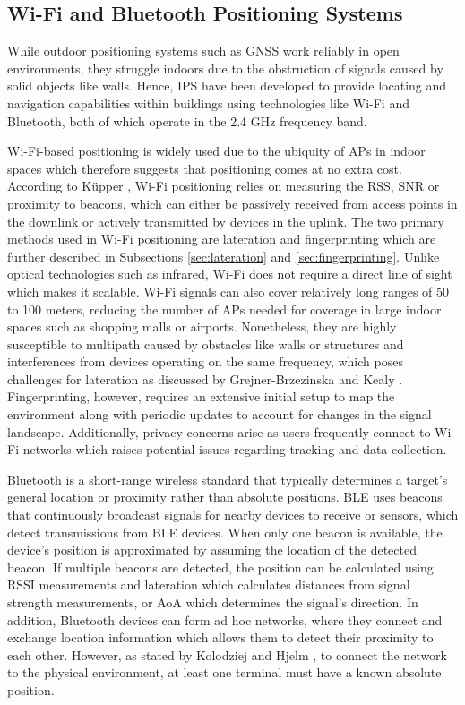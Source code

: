\subsection{Wi-Fi and Bluetooth Positioning Systems}
While outdoor positioning systems such as \acs{GNSS} work reliably in open environments, they struggle indoors due to the obstruction of signals caused by solid objects like walls.
Hence, \ac{IPS} have been developed to provide locating and navigation capabilities within buildings using technologies like \acs{Wi-Fi} and Bluetooth, both of which operate in the 2.4 GHz frequency band.

\acs{Wi-Fi}-based positioning is widely used due to the ubiquity of \ac{APs} in indoor spaces which therefore suggests that positioning comes at no extra cost.
According to K\"upper \cite{kupper2005location}, \acs{Wi-Fi} positioning relies on measuring the \acs{RSS}, \ac{SNR} or proximity to beacons, which can either be passively received from access points in the downlink or actively transmitted by devices in the uplink.
The two primary methods used in \acs{Wi-Fi} positioning are lateration and fingerprinting which are further described in Subsections \ref{sec:lateration} and \ref{sec:fingerprinting}.
Unlike optical technologies such as infrared, \acs{Wi-Fi} does not require a direct line of sight which makes it scalable.
\acs{Wi-Fi} signals can also cover relatively long ranges of 50 to 100 meters, reducing the number of \acs{APs} needed for coverage in large indoor spaces such as shopping malls or airports. 
Nonetheless, they are highly susceptible to multipath caused by obstacles like walls or structures and interferences from devices operating on the same frequency, which poses challenges for lateration as discussed by Grejner-Brzezinska and Kealy \cite{grejner2004positioning}.
Fingerprinting, however, requires an extensive initial setup to map the environment along with periodic updates to account for changes in the signal landscape.
Additionally, privacy concerns arise as users frequently connect to \acs{Wi-Fi} networks which raises potential issues regarding tracking and data collection.

Bluetooth is a short-range wireless standard that typically determines a target's general location or proximity rather than absolute positions.
\ac{BLE} uses beacons that continuously broadcast signals for nearby devices to receive or sensors, which detect transmissions from \acs{BLE} devices.
When only one beacon is available, the device's position is approximated by assuming the location of the detected beacon. 
If multiple beacons are detected, the position can be calculated using \ac{RSSI} measurements and lateration which calculates distances from signal strength measurements, or \acs{AoA} which determines the signal's direction.
In addition, Bluetooth devices can form ad hoc networks, where they connect and exchange location information which allows them to detect their proximity to each other. 
However, as stated by Kolodziej and Hjelm \cite{kolodziej2017local}, to connect the network to the physical environment, at least one terminal must have a known absolute position.

